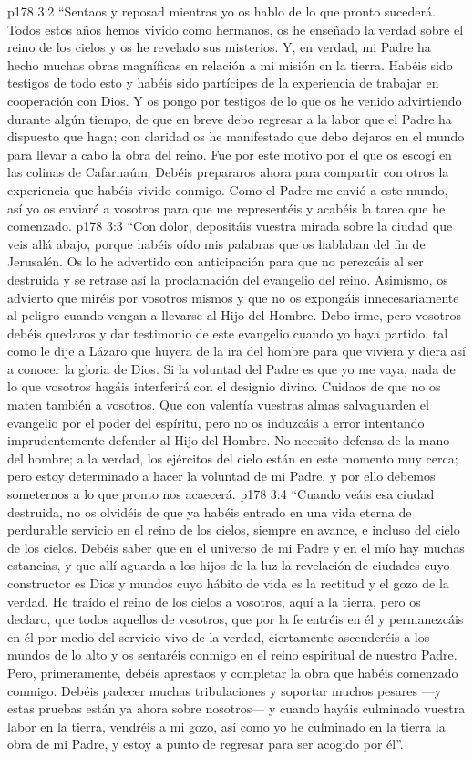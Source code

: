 \vs p178 3:2 \pc “Sentaos y reposad mientras yo os hablo de lo que pronto sucederá. Todos estos años hemos vivido como hermanos, os he enseñado la verdad sobre el reino de los cielos y os he revelado sus misterios. Y, en verdad, mi Padre ha hecho muchas obras magníficas en relación a mi misión en la tierra. Habéis sido testigos de todo esto y habéis sido partícipes de la experiencia de trabajar en cooperación con Dios. Y os pongo por testigos de lo que os he venido advirtiendo durante algún tiempo, de que en breve debo regresar a la labor que el Padre ha dispuesto que haga; con claridad os he manifestado que debo dejaros en el mundo para llevar a cabo la obra del reino. Fue por este motivo por el que os escogí en las colinas de Cafarnaúm. Debéis prepararos ahora para compartir con otros la experiencia que habéis vivido conmigo. Como el Padre me envió a este mundo, así yo os enviaré a vosotros para que me representéis y acabéis la tarea que he comenzado.
\vs p178 3:3 “Con dolor, depositáis vuestra mirada sobre la ciudad que veis allá abajo, porque habéis oído mis palabras que os hablaban del fin de Jerusalén. Os lo he advertido con anticipación para que no perezcáis al ser destruida y se retrase así la proclamación del evangelio del reino. Asimismo, os advierto que miréis por vosotros mismos y que no os expongáis innecesariamente al peligro cuando vengan a llevarse al Hijo del Hombre. Debo irme, pero vosotros debéis quedaros y dar testimonio de este evangelio cuando yo haya partido, tal como le dije a Lázaro que huyera de la ira del hombre para que viviera y diera así a conocer la gloria de Dios. Si la voluntad del Padre es que yo me vaya, nada de lo que vosotros hagáis interferirá con el designio divino. Cuidaos de que no os maten también a vosotros. Que con valentía vuestras almas salvaguarden el evangelio por el poder del espíritu, pero no os induzcáis a error intentando imprudentemente defender al Hijo del Hombre. No necesito defensa de la mano del hombre; a la verdad, los ejércitos del cielo están en este momento muy cerca; pero estoy determinado a hacer la voluntad de mi Padre, y por ello debemos someternos a lo que pronto nos acaecerá.
\vs p178 3:4 “Cuando veáis esa ciudad destruida, no os olvidéis de que ya habéis entrado en una vida eterna de perdurable servicio en el reino de los cielos, siempre en avance, e incluso del cielo de los cielos. Debéis saber que en el universo de mi Padre y en el mío hay muchas estancias, y que allí aguarda a los hijos de la luz la revelación de ciudades cuyo constructor es Dios y mundos cuyo hábito de vida es la rectitud y el gozo de la verdad. He traído el reino de los cielos a vosotros, aquí a la tierra, pero os declaro, que todos aquellos de vosotros, que por la fe entréis en él y permanezcáis en él por medio del servicio vivo de la verdad, ciertamente ascenderéis a los mundos de lo alto y os sentaréis conmigo en el reino espiritual de nuestro Padre. Pero, primeramente, debéis aprestaos y completar la obra que habéis comenzado conmigo. Debéis padecer muchas tribulaciones y soportar muchos pesares ---y estas pruebas están ya ahora sobre nosotros--- y cuando hayáis culminado vuestra labor en la tierra, vendréis a mi gozo, así como yo he culminado en la tierra la obra de mi Padre, y estoy a punto de regresar para ser acogido por él”.
